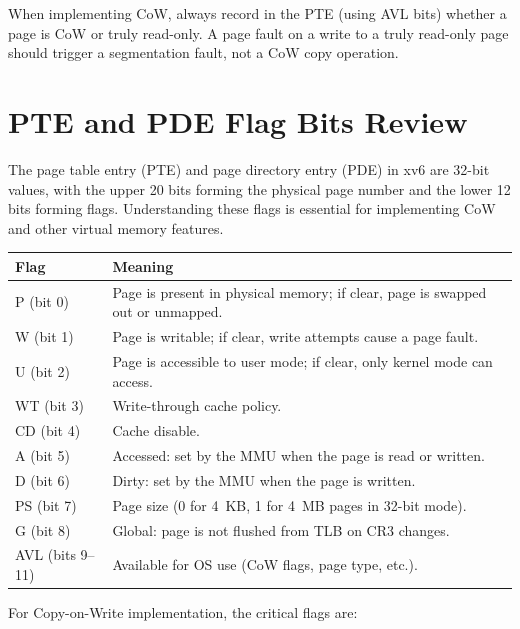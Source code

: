 \documentclass[11pt]{article}
\begin{document}
\begin{keytip}
When implementing CoW, always record in the PTE (using AVL bits) whether a page is CoW or truly read-only. A page fault on a write to a truly read-only page should trigger a segmentation fault, not a CoW copy operation.
\end{keytip}

\section{PTE and PDE Flag Bits Review}

The page table entry (PTE) and page directory entry (PDE) in xv6 are 32-bit values, with the upper 20 bits forming the physical page number and the lower 12 bits forming flags. Understanding these flags is essential for implementing CoW and other virtual memory features.

\begin{center}
\begin{tabular}{ll}
\toprule
\textbf{Flag} & \textbf{Meaning} \\
\midrule
P (bit 0) & Page is present in physical memory; if clear, page is swapped out or unmapped. \\
W (bit 1) & Page is writable; if clear, write attempts cause a page fault. \\
U (bit 2) & Page is accessible to user mode; if clear, only kernel mode can access. \\
WT (bit 3) & Write-through cache policy. \\
CD (bit 4) & Cache disable. \\
A (bit 5) & Accessed: set by the MMU when the page is read or written. \\
D (bit 6) & Dirty: set by the MMU when the page is written. \\
PS (bit 7) & Page size (0 for 4~KB, 1 for 4~MB pages in 32-bit mode). \\
G (bit 8) & Global: page is not flushed from TLB on CR3 changes. \\
AVL (bits 9--11) & Available for OS use (CoW flags, page type, etc.). \\
\bottomrule
\end{tabular}
\end{center}

For Copy-on-Write implementation, the critical flags are:
\end{document}
